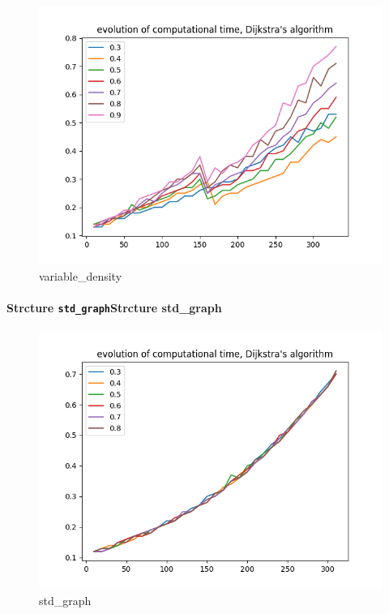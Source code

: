 \documentclass{article}
\begin{document}
\begin{figure}
\centering
\includegraphics{ressources/dijkstra_res_graph_density.png}
\caption{variable\_density}
\end{figure}

\paragraph{{Strcture
\texttt{std\_graph}}{Strcture std\_graph}}

\begin{figure}
\centering
\includegraphics{ressources/dijkstra_density_std_graph.png}
\caption{std\_graph}
\end{figure}
\end{document}
